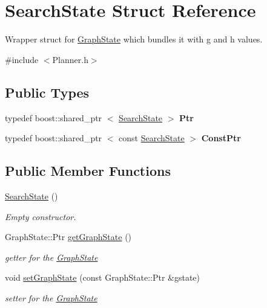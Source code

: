 \hypertarget{struct_search_state}{\section{\-Search\-State \-Struct \-Reference}
\label{struct_search_state}
}


\-Wrapper struct for \hyperlink{struct_graph_state}{\-Graph\-State} which bundles it with g and h values.  




{\ttfamily \#include $<$\-Planner.\-h$>$}

\subsection*{\-Public \-Types}
\begin{DoxyCompactItemize}
\item 
\hypertarget{struct_search_state_a224730930b9015a402793ad7fdaa3dae}{typedef boost\-::shared\-\_\-ptr\*
$<$ \hyperlink{struct_search_state}{\-Search\-State} $>$ {\bfseries \-Ptr}}\label{struct_search_state_a224730930b9015a402793ad7fdaa3dae}

\item 
\hypertarget{struct_search_state_ad4da46c4219dacf06fa3bcc7332b8826}{typedef boost\-::shared\-\_\-ptr\*
$<$ const \hyperlink{struct_search_state}{\-Search\-State} $>$ {\bfseries \-Const\-Ptr}}\label{struct_search_state_ad4da46c4219dacf06fa3bcc7332b8826}

\end{DoxyCompactItemize}
\subsection*{\-Public \-Member \-Functions}
\begin{DoxyCompactItemize}
\item 
\hyperlink{struct_search_state_afabe4bfbc9658c0e9d2a4a6a452cee3f}{\-Search\-State} ()
\begin{DoxyCompactList}\small\item\em \-Empty constructor. \end{DoxyCompactList}\item 
\-Graph\-State\-::\-Ptr \hyperlink{struct_search_state_a7681f5297abe522b586815bc32d20795}{get\-Graph\-State} ()
\begin{DoxyCompactList}\small\item\em getter for the \hyperlink{struct_graph_state}{\-Graph\-State} \end{DoxyCompactList}\item 
void \hyperlink{struct_search_state_a93576ac604beb57d4c09f0ff3a0587c9}{set\-Graph\-State} (const \-Graph\-State\-::\-Ptr \&gstate)
\begin{DoxyCompactList}\small\item\em setter for the \hyperlink{struct_graph_state}{\-Graph\-State} \end{DoxyCompactList}\end{DoxyCompactItemize}
